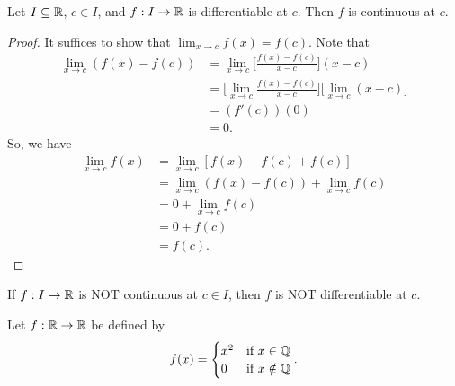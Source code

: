 \documentclass[a4paper]{article}
\begin{document}
\begin{theorem}
    Let \( I \subseteq  \mathbb{R}  \), \( c \in I  \), and \( f: I \to \mathbb{R}  \) is differentiable at \( c  \). Then \( f \) is continuous at \( c  \).
\end{theorem}

\begin{proof}
It suffices to show that \( \lim_{ x \to c } f(x) = f(c) \). Note that 
\begin{align*}
    \lim_{ x \to c } (f(x) - f(c)) &= \lim_{ x \to c }  \Big[ \frac{ f(x) - f(c) }{  x - c  }  \Big] (x - c) \\
                                   &= \Big[ \lim_{ x \to c }  \frac{ f(x) - f(c) }{  x - c  }  \Big] \Big[ \lim_{ x \to c }  (x - c) \Big] \\
                                   &= (f'(c)) (0) \\
                                   &= 0.
\end{align*}
So, we have 
\begin{align*}
    \lim_{ x \to c } f(x) &= \lim_{ x \to c }  [f(x)  - f(c) + f(c)] \\ 
                          &= \lim_{ x \to c } (f(x) - f(c)) + \lim_{ x \to c } f(c) \\   
                          &= 0 + \lim_{ x \to c } f(c) \\
                          &= 0 + f(c) \\
                          &= f(c).
\end{align*}
\end{proof}

\begin{corollary}
    If \( f: I \to \mathbb{R}  \) is NOT continuous at \( c \in I  \), then \( f \) is NOT differentiable at \( c  \).
\end{corollary}

\begin{eg}
    Let \( f: \mathbb{R} \to \mathbb{R}  \) be defined by 
    \[  f(x) = 
    \begin{cases}
        x^{2} &\text{if} \  x \in \mathbb{Q} \\
        0 &\text{if} \ x \notin \mathbb{Q} 
    \end{cases}. \]
\end{eg}
\end{document}

